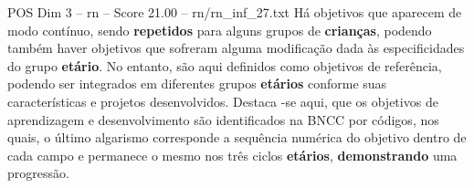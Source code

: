 \begin{textsample}{POS Dim 3 – rn – Score 21.00 – rn/rn\_inf\_27.txt}
Há objetivos que aparecem de modo contínuo, sendo \textbf{repetidos} para alguns grupos de \textbf{crianças}, podendo também haver objetivos que sofreram alguma modificação dada às especificidades do grupo \textbf{etário}.
No entanto, são aqui definidos como objetivos de referência, podendo ser integrados em diferentes grupos \textbf{etários} conforme suas características e projetos desenvolvidos.
Destaca -se aqui, que os objetivos de aprendizagem e desenvolvimento são identificados na BNCC por códigos, nos quais, o último algarismo corresponde a sequência numérica do objetivo dentro de cada campo e permanece o mesmo nos três ciclos \textbf{etários}, \textbf{demonstrando} uma progressão.

\end{textsample}
